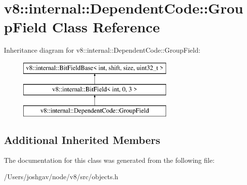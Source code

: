 \hypertarget{classv8_1_1internal_1_1_dependent_code_1_1_group_field}{}\section{v8\+:\+:internal\+:\+:Dependent\+Code\+:\+:Group\+Field Class Reference}
\label{classv8_1_1internal_1_1_dependent_code_1_1_group_field}
Inheritance diagram for v8\+:\+:internal\+:\+:Dependent\+Code\+:\+:Group\+Field\+:\begin{figure}[H]
\begin{center}
\leavevmode
\includegraphics[height=3.000000cm]{classv8_1_1internal_1_1_dependent_code_1_1_group_field}
\end{center}
\end{figure}
\subsection*{Additional Inherited Members}


The documentation for this class was generated from the following file\+:\begin{DoxyCompactItemize}
\item 
/\+Users/joshgav/node/v8/src/objects.\+h\end{DoxyCompactItemize}
